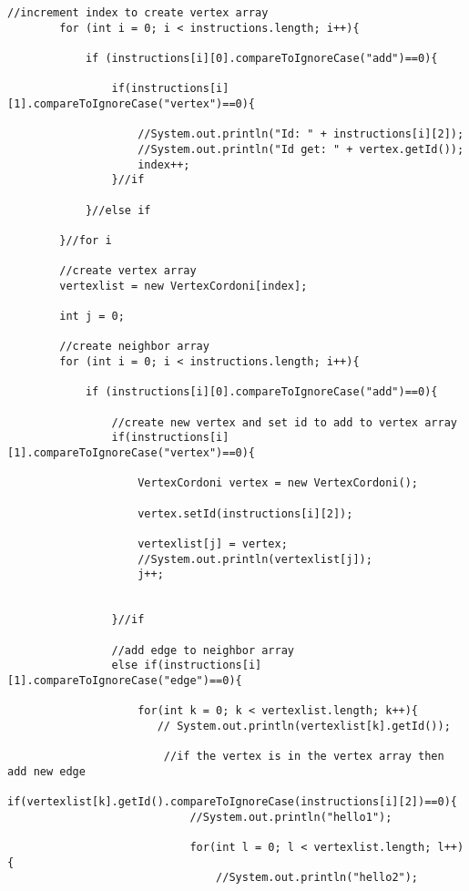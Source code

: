 \documentclass[letterpaper, 10pt,DIV=13]{scrartcl}
\numberwithin{equation}{section} %
\numberwithin{figure}{section} %
\numberwithin{table}{section} %
\begin{document}
\begin{lstlisting}[frame=single, ]
        //increment index to create vertex array
        for (int i = 0; i < instructions.length; i++){

            if (instructions[i][0].compareToIgnoreCase("add")==0){

                if(instructions[i][1].compareToIgnoreCase("vertex")==0){

                    //System.out.println("Id: " + instructions[i][2]);
                    //System.out.println("Id get: " + vertex.getId()); 
                    index++;
                }//if

            }//else if  
            
        }//for i

        //create vertex array
        vertexlist = new VertexCordoni[index];

        int j = 0;

        //create neighbor array
        for (int i = 0; i < instructions.length; i++){

            if (instructions[i][0].compareToIgnoreCase("add")==0){

                //create new vertex and set id to add to vertex array
                if(instructions[i][1].compareToIgnoreCase("vertex")==0){

                    VertexCordoni vertex = new VertexCordoni();

                    vertex.setId(instructions[i][2]);
                        
                    vertexlist[j] = vertex;
                    //System.out.println(vertexlist[j]);
                    j++;
                    
                    
                }//if
                
                //add edge to neighbor array
                else if(instructions[i][1].compareToIgnoreCase("edge")==0){
        
                    for(int k = 0; k < vertexlist.length; k++){
                       // System.out.println(vertexlist[k].getId());

                        //if the vertex is in the vertex array then add new edge
                        if(vertexlist[k].getId().compareToIgnoreCase(instructions[i][2])==0){
                            //System.out.println("hello1");

                            for(int l = 0; l < vertexlist.length; l++){
                                //System.out.println("hello2");


\end{lstlisting}
\end{document}
